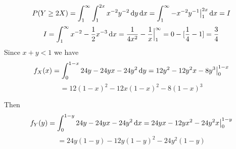 \documentclass[11pt,largemargins]{homework}
\begin{document}
\[P(Y \geq 2X) = \int_1^\infty \int_1^{2x} x^{-2}y^{-2} \dif y \dif x = \int_1^\infty -x^{-2}y^{-1} \big|_1^{2x} \dif x = I \] 
\[ I = \int_1^\infty x^{-2} - \frac{1}{2}x^{-3} \dif x = \frac{1}{4x^2}-\frac{1}{x} \Big|_1^\infty = 0 - [\frac{1}{4}-1] = \frac{3}{4} \] 
\newpage
\question 
Since $x + y < 1$ we have 
\[f_X(x) = \int_0^{1 - x} 24y - 24yx - 24y^2 \dif y = 12y^2 - 12y^2x - 8y^3 \big|_0^{1 - x}\]
\[ = 12(1 - x)^2 - 12x(1- x)^2 - 8(1 - x)^3\]

Then 
\[ f_Y(y) = \int_0^{1 - y}24y - 24yx - 24y^2 \dif x = 24yx - 12yx^2 - 24y^2x \big|_0^{1-y} \]
\[= 24y(1 - y)- 12y(1 - y)^2 - 24y^2(1 - y) \]
\end{document}
